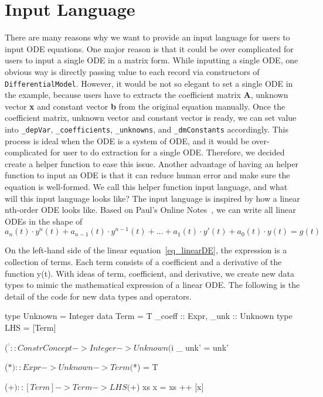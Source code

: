 \section{Input Language}
\label{sec_input}
There are many reasons why we want to provide an input language for users to input ODE equations. One major reason is that it could be over complicated for users to input a single ODE in a matrix form. While inputting a single ODE, one obvious way is directly passing value to each record via constructors of \verb|DifferentialModel|. However, it would be not so elegant to set a single ODE in the example, because users have to extracts the coefficient matrix \textbf{A}, unknown vector \textbf{x} and constant vector \textbf{b} from the original equation manually. Once the coefficient matrix, unknown vector and constant vector is ready, we can set value into \verb|_depVar|, \verb|_coefficients|, \verb|_unknowns|, and \verb|_dmConstants| accordingly. This process is ideal when the ODE is a system of ODE, and it would be over-complicated for user to do extraction for a single ODE. Therefore, we decided create a helper function to ease this issue. Another advantage of having an helper function to input an ODE is that it can reduce human error and make sure the equation is well-formed. We call this helper function input language, and what will this input language looks like? The input language is inspired by how a linear nth-order ODE looks like. Based on Paul's Online Notes~\citep{paullinearode}, we can write all linear ODEs in the shape of 
\begin{equation} \label{eq_linearDE}
	a_n(t) \cdot y^n(t) + a_{n-1}(t) \cdot y^{n-1}(t) + \dots + a_1(t) \cdot y'(t) + a_0(t) \cdot y(t) = g(t)
\end{equation}

On the left-hand side of the linear equation~\ref{eq_linearDE}, the expression is a collection of terms. Each term consists of a coefficient and a derivative of the function y(t). With ideas of term, coefficient, and derivative, we create new data types to mimic the mathematical expression of a linear ODE. The following is the detail of the code for new data types and operators.

\begin{haskell1}
type Unknown = Integer
data Term = T{
	_coeff :: Expr,
	_unk :: Unknown
}
type LHS = [Term]

($^^) :: ConstrConcept -> Integer -> Unknown
($^^) _ unk' = unk'

($*) :: Expr -> Unknown -> Term
($*) = T

($+) :: [Term] -> Term -> LHS
($+) xs x  = xs ++ [x]
\end{haskell1}

